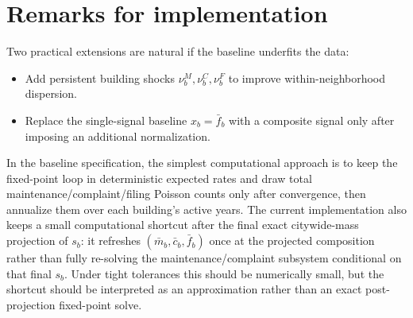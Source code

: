\documentclass[11pt]{article}
\begin{document}
\section{Remarks for implementation}
Two practical extensions are natural if the baseline underfits the data:
\begin{itemize}
    \item Add persistent building shocks $\nu_b^M,\nu_b^C,\nu_b^F$ to improve within-neighborhood dispersion.
    \item Replace the single-signal baseline $x_b=\bar f_b$ with a composite signal only after imposing an additional normalization.
\end{itemize}
In the baseline specification, the simplest computational approach is to keep the fixed-point loop in deterministic expected rates and draw total maintenance/complaint/filing Poisson counts only after convergence, then annualize them over each building's active years. The current implementation also keeps a small computational shortcut after the final exact citywide-mass projection of $s_b$: it refreshes $(\bar m_b,\bar c_b,\bar f_b)$ once at the projected composition rather than fully re-solving the maintenance/complaint subsystem conditional on that final $s_b$. Under tight tolerances this should be numerically small, but the shortcut should be interpreted as an approximation rather than an exact post-projection fixed-point solve.
\end{document}
